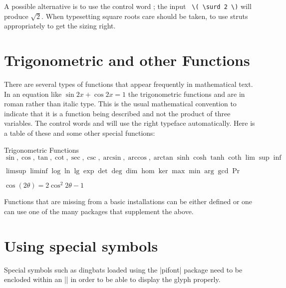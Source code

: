 \begin{macro}{\surd}
 A possible alternative is to use the control word ; the input  \verb+ \( \surd 2 \)+ will
produce \(\surd 2\). When typesetting square roots care should be taken, to use struts appropriately to get the sizing right.
\end{macro}


\section{Trigonometric and other Functions}

There are several types of functions that appear frequently in mathematical text. In
an equation like $\sin2x+\cos2x=1$ the trigonometric functions  and  are in
roman rather than italic type. This is the usual mathematical convention to indicate that
it is a function being described and not the product of three variables. The control words
 and  will use the right typeface automatically. 
Here is a table of these and some other special functions:

\begin{texexample}{Trigonometric Functions}{}
\begin{math}
\sin, \cos, \tan, \cot, \sec, \csc, \arcsin, \arccos,
\arctan \sinh \cosh \tanh \coth \lim \sup \inf
\end{math}

\begin{math}
\limsup \liminf \log \ln \lg \exp \det \deg
\dim \hom \ker \max \min \arg \gcd \Pr
\end{math}

\begin{math}
\cos(2\theta) = 2 \cos^{2}2 \theta-1
\end{math}
\end{texexample}

Functions that are missing from a basic installations can be either defined or one can use one of the many packages that supplement the above.


\section{Using special symbols}

Special symbols such as dingbats loaded using the |pifont| package need to be encloded within an |\mbox| in order to be able to display the glyph properly.
\bigskip

